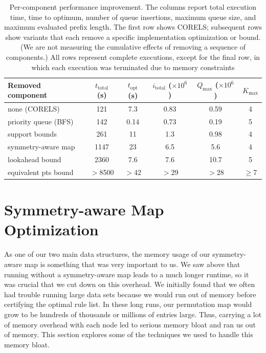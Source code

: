 \begin{table}[t!]
\begin{tabular}{l | c | c | c | c | c}
Removed component & $t_\text{total}$ (s) & $t_\text{opt}$ (s) & $i_\text{total}$ ($\times 10^6$) & $Q_\text{max}$ ($\times 10^6$) & $K_\text{max}$ \\
\hline
none (CORELS) & 121 & 7.3 & 0.83 & 0.59 & 4 \\
priority queue (BFS) & 142 & 0.14 & 0.73 & 0.19 & 5 \\
support bounds & 261 & 11 & 1.3 & 0.98 & 4 \\
symmetry-aware map & 1147 & 23 & 6.5 & 5.6 & 4 \\
lookahead bound & 2360 & 7.6 & 7.6 & 10.7 & 5 \\
equivalent pts bound & $>$8500 & $>$42 & $>$29 & $>$28 & $\ge$7
\end{tabular}
\vspace{4mm}
\caption{Per-component performance improvement.
%
The columns report total execution time,
time to optimum, number of queue insertions,
maximum queue size, and maximum evaluated prefix length.
%
The first row shows CORELS; subsequent rows show variants
that each remove a specific implementation optimization or bound.
%
(We are not measuring the cumulative effects of removing a sequence of components.)
%
All rows represent complete executions, except for the final row,
in which each execution was terminated due to memory constraints
}
\label{tab:ablation}
\end{table}

\section{Symmetry-aware Map Optimization}

As one of our two main data structures, the memory usage of our symmetry-aware map is something that was very important to us.
We saw above that running without a symmetry-aware map leads to a much longer runtime, so it was crucial that we cut down on this overhead.
We initially found that we often had trouble running large data sets because we would run out of memory before certifying the optimal rule list.
In these long runs, our permutation map would grow to be hundreds of thousands or millions of entries large.
Thus, carrying a lot of memory overhead with each node led to serious memory bloat and ran us out of memory.
This section explores some of the techniques we used to handle this memory bloat.

